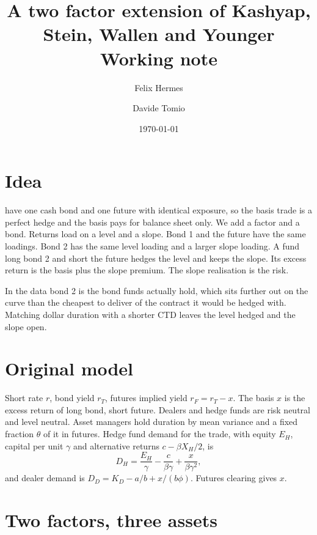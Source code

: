 \documentclass[12pt]{article}
\title{A two factor extension of Kashyap, Stein, Wallen and Younger\\ \large Working note}
\author{Felix Hermes \and Davide Tomio}
\date{\today}
\begin{document}
\maketitle

\section{Idea}

\citet{kashyap2025} have one cash bond and one future with identical exposure, so the basis trade is a perfect hedge and the basis pays for balance sheet only. We add a factor and a bond. Returns load on a level and a slope. Bond 1 and the future have the same loadings. Bond 2 has the same level loading and a larger slope loading. A fund long bond 2 and short the future hedges the level and keeps the slope. Its excess return is the basis plus the slope premium. The slope realisation is the risk.

In the data bond 2 is the bond funds actually hold, which sits further out on the curve than the cheapest to deliver of the contract it would be hedged with. Matching dollar duration with a shorter CTD leaves the level hedged and the slope open.

\section{Original model}

Short rate $r$, bond yield $r_T$, futures implied yield $r_F = r_T - x$. The basis $x$ is the excess return of long bond, short future. Dealers and hedge funds are risk neutral and level neutral. Asset managers hold duration by mean variance and a fixed fraction $\theta$ of it in futures. Hedge fund demand for the trade, with equity $E_H$, capital per unit $\gamma$ and alternative returns $c - \beta X_H / 2$, is
\begin{equation}
D_H = \frac{E_H}{\gamma} - \frac{c}{\beta \gamma} + \frac{x}{\beta \gamma^2} ,
\label{eq:dh}
\end{equation}
and dealer demand is $D_D = K_D - a/b + x/(b\phi)$. Futures clearing gives $x$.

\section{Two factors, three assets}
\end{document}
